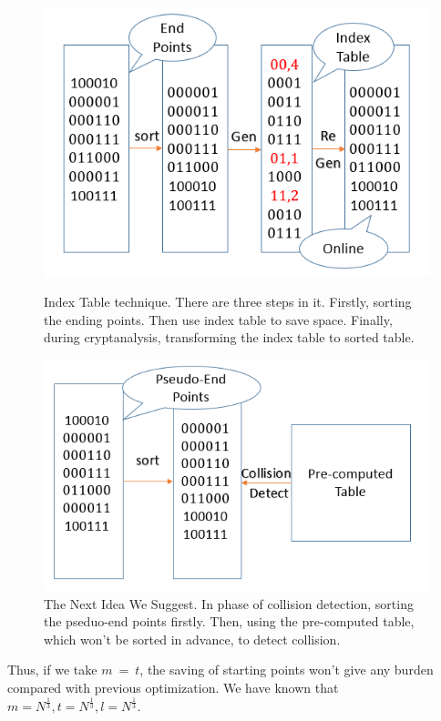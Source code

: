 \documentclass[runningheads,a4paper]{llncs}
\begin{document}
\begin{figure}[!htb]
  \includegraphics[width=\linewidth]{graph9}
  \caption{Index Table technique. There are three steps in it. Firstly, sorting the ending points. Then use index table to save space. Finally, during cryptanalysis, transforming the index table to sorted table.}
\endminipage\hfill
{}
  \includegraphics[width=\linewidth]{graph10}
  \caption{The Next Idea We Suggest. In phase of collision detection, sorting the pseduo-end points firstly. Then, using the pre-computed table, which won't be sorted in advance, to detect collision.}
\endminipage\hfill
\end{figure}

Thus, if we take $m~=~t$, the saving of starting points won't give any burden compared with previous optimization. We have known that $m = N^{\frac{1}{3}}, t = N^{\frac{1}{3}}, l = N^{\frac{1}{3}}$.
\end{document}
